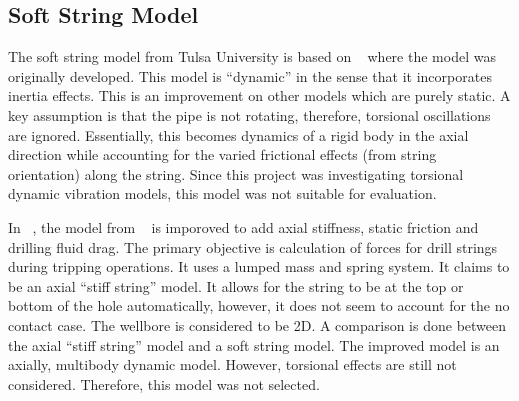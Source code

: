 \subsection{Soft String Model}
\label{sec:tulasoftstring}
The soft string model from Tulsa University is based on ~\cite{ref:miska2015a} where the model was originally developed.  This model is ``dynamic'' in the sense that it incorporates inertia effects.  This is an improvement on other models which are purely static.  A key assumption is that the pipe is not rotating, therefore, torsional oscillations are ignored.  Essentially, this becomes dynamics of a rigid body in the axial direction while accounting for the varied frictional effects (from string orientation) along the string.  Since this project was investigating torsional dynamic vibration models, this model was not suitable for evaluation.

In ~\cite{ref:zamanipour2018a}, the model from ~\cite{ref:miska2015a} is imporoved to add axial stiffness, static friction and drilling fluid drag.  The primary objective is calculation of forces for drill strings during tripping operations.  It uses a lumped mass and spring system.  It claims to be an axial ``stiff string'' model.  It allows for the string to be at the top or bottom of the hole automatically, however, it does not seem to account for the no contact case.  The wellbore is considered to be 2D.  A comparison is done between the axial ``stiff string'' model and a soft string model.  The improved model is an axially, multibody dynamic model.  However, torsional effects are still not considered.  Therefore, this model was not selected.



